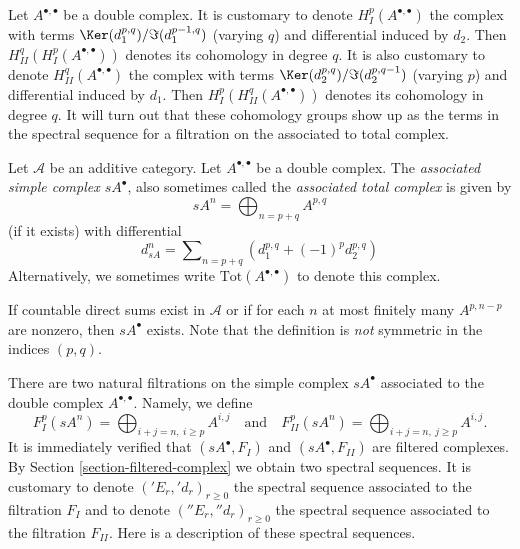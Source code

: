 \noindent
Let $A^{\bullet, \bullet}$ be a double complex. It is customary to denote
$H^p_I(A^{\bullet, \bullet})$
the complex with terms $\Ker(d_1^{p, q})/\Im(d_1^{p - 1, q})$
(varying $q$) and differential induced by $d_2$.
Then $H^q_{II}(H^p_I(A^{\bullet, \bullet}))$ denotes its cohomology in
degree $q$. It is also customary to denote $H^q_{II}(A^{\bullet, \bullet})$
the complex with terms $\Ker(d_2^{p, q})/\Im(d_2^{p, q - 1})$
(varying $p$) and differential induced by $d_1$.
Then $H^p_I(H^q_{II}(A^{\bullet, \bullet}))$ denotes its cohomology in
degree $q$. It will turn out that these cohomology groups show up
as the terms in the spectral sequence for a filtration on the
associated to total complex.

\begin{definition}
\label{definition-associated-simple-complex}
Let $\mathcal{A}$ be an additive category.
Let $A^{\bullet, \bullet}$ be a double complex.
The {\it associated simple complex $sA^\bullet$}, also
sometimes called the {\it associated total complex} is
given by
$$
sA^n = \bigoplus\nolimits_{n = p + q} A^{p, q}
$$
(if it exists) with differential
$$
d_{sA}^n = \sum\nolimits_{n = p + q} (d_1^{p, q} + (-1)^p d_2^{p, q})
$$
Alternatively, we sometimes write $\text{Tot}(A^{\bullet, \bullet})$
to denote this complex.
\end{definition}

\noindent
If countable direct sums exist in $\mathcal{A}$ or if for each $n$ at most
finitely many $A^{p, n - p}$ are nonzero, then $sA^\bullet$ exists. Note that
the definition is {\it not} symmetric in the indices $(p, q)$.

\medskip\noindent
There are two natural filtrations on the simple complex $sA^\bullet$
associated to the double complex $A^{\bullet, \bullet}$. Namely, we
define
$$
F_I^p(sA^n) = \bigoplus\nolimits_{i + j = n, \ i \geq p} A^{i, j}
\quad
\text{and}
\quad
F_{II}^p(sA^n) = \bigoplus\nolimits_{i + j = n, \ j \geq p} A^{i, j}.
$$
It is immediately verified that $(sA^\bullet, F_I)$ and
$(sA^\bullet, F_{II})$ are filtered complexes.
By Section \ref{section-filtered-complex}
we obtain two spectral sequences. It is customary to
denote $({}'E_r, {}'d_r)_{r \geq 0}$ the spectral sequence associated
to the filtration $F_I$ and to denote $({}''E_r, {}''d_r)_{r \geq 0}$
the spectral sequence associated to the filtration $F_{II}$.
Here is a description of these spectral sequences.

